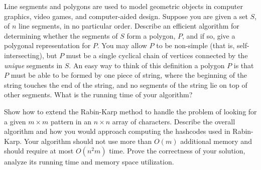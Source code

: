 \documentclass{common/cs157}
\begin{document}

\begin{problem}{2}
        Line segments and polygons are used to model geometric objects in computer graphics, video games, and computer-aided design. Suppose you are given a set $S$, of $n$ line segments, in no particular order. Describe an efficient algorithm for determining whether the segments of $S$ form a polygon, $P$, and if so, give a polygonal representation for $P$. You may allow $P$ to be non-simple (that is, self-intersecting), but $P$ must be a single cyclical chain of vertices connected by the \textit{unique} segments in $S$. An easy way to think of this definition a polygon $P$ is that $P$ must be able to be formed by one piece of string, where the beginning of the string touches the end of the string, and no segments of the string lie on top of other segments. What is the running time of your algorithm?
\end{problem}
\newpage
\begin{problem}{3}
Show how to extend the Rabin-Karp method to handle the problem of looking for a given $m\times m$ pattern in an $n\times n$ array of characters. Describe the overall algorithm and how you would approach computing the hashcodes used in Rabin-Karp. Your algorithm should not use more than $O(m)$ additional memory and should require at most $O(n^2m)$ time. Prove the correctness of your solution, analyze its running time and memory space utilization.
\end{problem}
\end{document}
